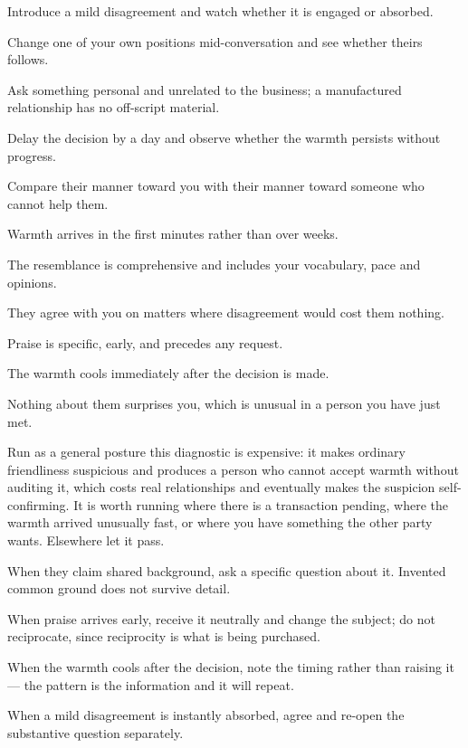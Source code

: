 \begin{application}
  \item Introduce a mild disagreement and watch whether it is engaged or absorbed.
  \item Change one of your own positions mid-conversation and see whether theirs follows.
  \item Ask something personal and unrelated to the business; a manufactured relationship has no off-script material.
  \item Delay the decision by a day and observe whether the warmth persists without progress.
  \item Compare their manner toward you with their manner toward someone who cannot help them.
\end{application}

\begin{feedback}
  \item Warmth arrives in the first minutes rather than over weeks.
  \item The resemblance is comprehensive and includes your vocabulary, pace and opinions.
  \item They agree with you on matters where disagreement would cost them nothing.
  \item Praise is specific, early, and precedes any request.
  \item The warmth cools immediately after the decision is made.
  \item Nothing about them surprises you, which is unusual in a person you have just met.
\end{feedback}

\begin{failure}
Run as a general posture this diagnostic is expensive: it makes ordinary friendliness suspicious and produces a person who cannot accept warmth without auditing it, which costs real relationships and eventually makes the suspicion self-confirming. It is worth running where there is a transaction pending, where the warmth arrived unusually fast, or where you have something the other party wants. Elsewhere let it pass.
\end{failure}

\begin{countermeasures}
  \item When they claim shared background, ask a specific question about it. Invented common ground does not survive detail.
  \item When praise arrives early, receive it neutrally and change the subject; do not reciprocate, since reciprocity is what is being purchased.
  \item When the warmth cools after the decision, note the timing rather than raising it --- the pattern is the information and it will repeat.
  \item When a mild disagreement is instantly absorbed, agree and re-open the substantive question separately.
\end{countermeasures}

\seesources
{}
